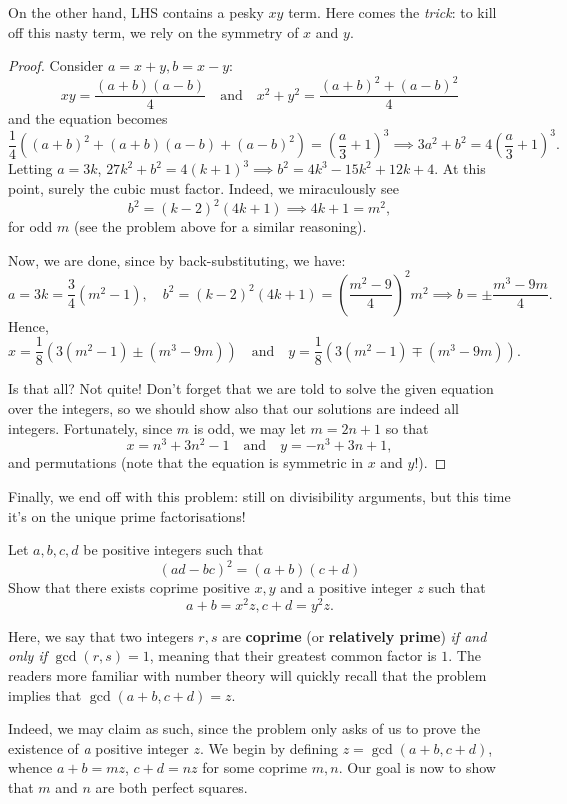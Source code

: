 \documentclass[../main.tex]{subfiles}
\begin{document}
On the other hand, LHS contains a pesky $xy$ term. Here comes the \textit{trick}: to kill off this nasty term, we rely on the symmetry of $x$ and $y$. 
\begin{proof}
    Consider $a=x+y, b=x-y$:
    $$xy= \frac{(a+b)(a-b)}{4} \quad\text{and}\quad x^2+y^2= \frac{(a+b)^2+(a-b)^2}{4}$$
and the equation becomes
$$\frac{1}{4}\left((a+b)^2+(a+b)(a-b)+(a-b)^2\right)=\left(\frac{a}{3}+1\right)^3 \implies 3a^2+b^2=4\left(\frac{a}{3}+1\right)^3.$$
Letting $a=3k$, $27k^2+b^2=4(k+1)^3 \implies b^2=4k^3-15k^2+12k+4$.
At this point, surely the cubic must factor. Indeed, we miraculously see
$$b^2=(k-2)^2(4k+1) \implies 4k+1=m^2,$$
for odd $m$ (see the problem above for a similar reasoning).

Now, we are done, since by back-substituting, we have:
$$a=3k=\frac{3}{4}(m^2-1), \quad b^2=(k-2)^2(4k+1)=\left(\frac{m^2-9}{4}\right)^2m^2 \implies b=\pm \frac{m^3-9m}{4}.$$
Hence,
$$x=\frac{1}{8}\left(3(m^2-1)\pm(m^3-9m)\right)\quad\text{and}\quad y=\frac{1}{8}\left(3(m^2-1)\mp(m^3-9m)\right).$$

Is that all? Not quite! Don't forget that we are told to solve the given equation over the integers, so we should show also that our solutions are indeed all integers. Fortunately, since $m$ is odd, we may let $m=2n+1$ so that
$$\boxed{x=n^3+3n^2-1\quad\text{and}\quad y=-n^3+3n+1},$$
and permutations (note that the equation is symmetric in $x$ and $y$!).
\end{proof}

Finally, we end off with this problem: still on divisibility arguments, but this time it's on the unique prime factorisations!
\begin{example}[2021 H3 Math P1 Q4]
Let $a,b,c,d$ be positive integers such that
\begin{equation}\label{5.3-det}
    (ad-bc)^2=(a+b)(c+d)
\end{equation}
Show that there exists coprime positive $x,y$ and a positive integer $z$ such that
$$a+b=x^2z, c+d=y^2z.$$
\end{example}
Here, we say that two integers $r,s$ are \textbf{coprime} (or \textbf{relatively prime}) \textit{if and only if} $\gcd(r,s)=1$, meaning that their greatest common factor is $1$. The readers more familiar with number theory will quickly recall that the problem implies that $\gcd(a+b, c+d)=z$.

Indeed, we may claim as such, since the problem only asks of us to prove the existence of \textit{a} positive integer $z$. We begin by defining $z=\gcd(a+b, c+d)$, whence $a+b=mz$, $c+d=nz$ for some coprime $m, n$. Our goal is now to show that $m$ and $n$ are both perfect squares.
\end{document}
